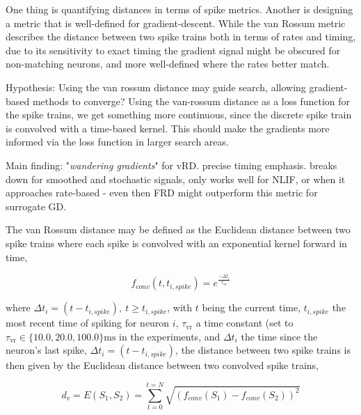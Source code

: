 \documentclass[mphil,deptreport,ianc]{infthesis} %
\begin{document}
One thing is quantifying distances in terms of spike metrics.
Another is designing a metric that is well-defined for gradient-descent.
While the van Rossum metric describes the distance between two spike trains both in terms of rates and timing, due to its sensitivity to exact timing the gradient signal might be obscured for non-matching neurons, and more well-defined where the rates better match.

Hypothesis: Using the van rossum distance may guide search, allowing gradient-based methods to converge?
Using the van-rossum distance as a loss function for the spike trains, we get something more continuous, since the discrete spike train is convolved with a time-based kernel. 
This should make the gradients more informed via the loss function in larger search areas.


Main finding: 
"\textit{wandering gradients}" for vRD.
precise timing emphasis. breaks down for smoothed and stochastic signals, only works well for NLIF, or when it approaches rate-based - even then FRD might outperform this metric for surrogate GD.

The van Rossum distance \cite{VanRossum2001} may be defined as the Euclidean distance between two spike trains where each spike is convolved with an exponential kernel forward in time,

\begin{equation}
    f_{conv}(t, t_{i, spike}) = e^{\frac{-\Delta t_i}{\tau_{\mathrm{vr}}}}
\end{equation}

where $\Delta t_i = (t-t_{i, spike}),\ t \geq t_{i,spike}$, 
with $t$ being the current time, $t_{i,spike}$ the most recent time of spiking for neuron $i$, $\tau_{\mathrm{vr}}$ a time constant (set to $\tau_{\mathrm{vr}} \in \{10.0, 20.0, 100.0\} \si{\ms}$ in the experiments, and $\Delta t_i$ the time since the neuron's last spike, $\Delta t_i = (t-t_{i, spike})$, the distance between two spike trains is then given by the Euclidean distance between two convolved spike trains,


\begin{equation}
    d_v = E(S_1, S_2) = \sum_{t=0}^{t=N} \sqrt{(f_{conv}(S_1)-f_{conv}(S_2))^2}
\end{equation}
\end{document}
